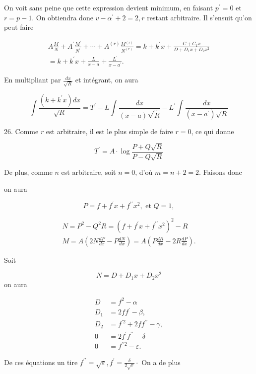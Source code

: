\documentclass{article}
\begin{document}
On voit sans peine que cette expression devient minimum, en faisant \(p^{\prime}=0\) et \(r=p-1\). On obtiendra done \(v-\alpha^{\prime}+2=2, r\) restant arbitraire. Il s'ensuit qu'on peut faire

\[
\begin{gathered}
A \frac{M}{N}+A^{\prime} \frac{M^{\prime}}{N^{\prime}}+\cdots+A^{(r)} \frac{M^{(r)}}{N^{(r)}}=k+k^{\prime} x+\frac{C+C_{1} x}{D+D_{1} x+D_{2} x^{2}} \\
=k+k^{\prime} x+\frac{L}{x-a}+\frac{L^{\prime}}{x-a^{\prime}} .
\end{gathered}
\]

En multipliant par \(\frac{d x}{\sqrt{R}}\) et intégrant, on aura

\[
\int \frac{\left(k+k^{\prime} x\right) d x}{\sqrt{R}}=T^{\prime}-L \int \frac{d x}{(x-a) \sqrt{\tilde{R}}}-L^{\prime} \int \frac{d x}{\left(x-a^{\prime}\right) \sqrt{R}}
\]

26. Comme \(r\) est arbitraire, il est le plus simple de faire \(r=0\), ce qui donne

\[
T^{\prime}=A \cdot \log \frac{P+Q \sqrt{R}}{P-Q \sqrt{R}}
\]

De plus, comme \(n\) est arbitraire, soit \(n=0\), d'où \(m=n+2=2\). Faisons donc

on aura

\[
P=f+f^{\prime} x+f^{\prime \prime} x^{2}, \text { et } Q=1,
\]

\[
\begin{gathered}
N=P^{2}-Q^{2} R=\left(f+f^{\prime} x+f^{\prime \prime} x^{2}\right)^{2}-R \\
M=A\left(2 N \frac{d P}{d x}-P \frac{d N}{d x}\right)=A\left(P \frac{d R}{d x}-2 R \frac{d P}{d x}\right) .
\end{gathered}
\]

Soit

\[
N=D+D_{1} x+D_{2} x^{2}
\]
on aura

\[
\begin{aligned}
D & =f^{2}-\alpha \\
D_{1} & =2 f f^{\prime}-\beta, \\
D_{2} & =f^{\prime 2}+2 f f^{\prime \prime}-\gamma, \\
0 & =2 f^{\prime} f^{\prime \prime}-\delta \\
0 & =f^{\prime \prime 2}-\varepsilon .
\end{aligned}
\]

De ces équations un tire \(f^{\prime \prime}=\sqrt{\varepsilon}, f^{\prime}=\frac{\delta}{2 \sqrt{\varepsilon}} \cdot\) On a de plus
\end{document}
